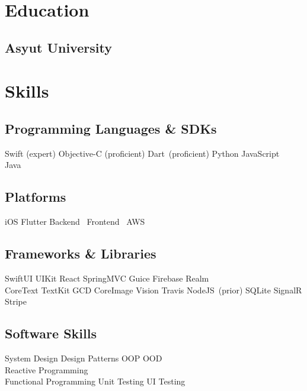 \documentclass[]{deedy-resume-openfont}
\begin{document}
\hfill
\begin{minipage}[t]{1\textwidth} 

\section{Education} 

\subsection{Asyut University}
\sectionsep


\section{Skills}
\subsection{Programming Languages \& SDKs}
Swift (expert) \textbullet{} Objective-C (proficient) \textbullet{} Dart\ (proficient) \textbullet{} Python \textbullet{} JavaScript\ \textbullet{} Java\
\sectionsep
\subsection{Platforms}
iOS \textbullet{} Flutter \textbullet{} Backend\ \textbullet{} Frontend\ \textbullet{} AWS\
\sectionsep
\subsection{Frameworks \& Libraries}
SwiftUI \textbullet{} UIKit \textbullet{} React \textbullet{} SpringMVC \textbullet{} Guice \textbullet{}
Firebase \textbullet{} Realm \textbullet{} \\CoreText \textbullet{} TextKit \textbullet{} GCD \textbullet{} CoreImage \textbullet{} Vision \textbullet{} Travis \textbullet{} NodeJS\ (prior) \textbullet{} SQLite \textbullet{} SignalR \textbullet{} Stripe
\sectionsep
\subsection{Software Skills}
System Design \textbullet{} Design Patterns \textbullet{} OOP \textbullet{} OOD \textbullet{}\\ Reactive Programming \textbullet{} \\ Functional Programming \textbullet{} Unit Testing \textbullet{} UI Testing
\sectionsep

\end{minipage}
\end{document}
